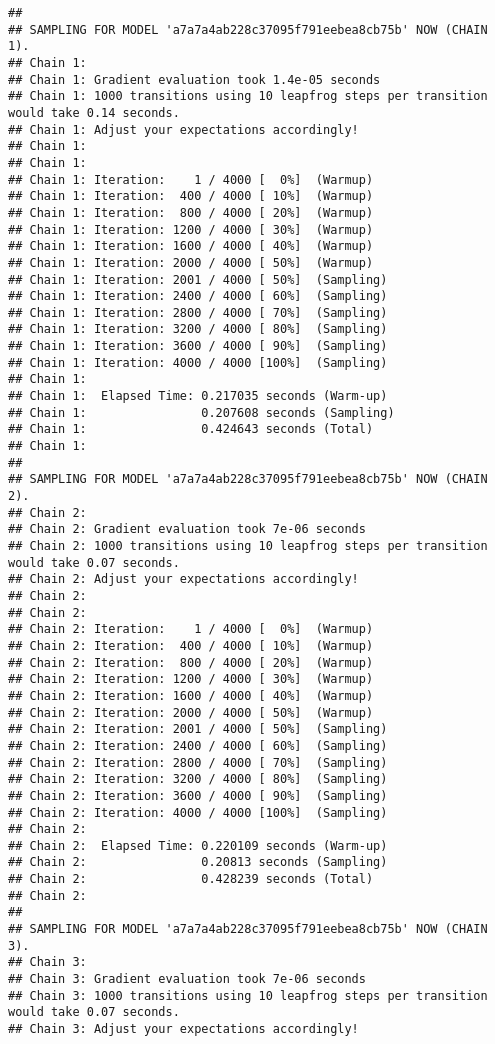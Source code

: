 \documentclass[]{article}
\begin{document}
\begin{verbatim}
## 
## SAMPLING FOR MODEL 'a7a7a4ab228c37095f791eebea8cb75b' NOW (CHAIN 1).
## Chain 1: 
## Chain 1: Gradient evaluation took 1.4e-05 seconds
## Chain 1: 1000 transitions using 10 leapfrog steps per transition would take 0.14 seconds.
## Chain 1: Adjust your expectations accordingly!
## Chain 1: 
## Chain 1: 
## Chain 1: Iteration:    1 / 4000 [  0%]  (Warmup)
## Chain 1: Iteration:  400 / 4000 [ 10%]  (Warmup)
## Chain 1: Iteration:  800 / 4000 [ 20%]  (Warmup)
## Chain 1: Iteration: 1200 / 4000 [ 30%]  (Warmup)
## Chain 1: Iteration: 1600 / 4000 [ 40%]  (Warmup)
## Chain 1: Iteration: 2000 / 4000 [ 50%]  (Warmup)
## Chain 1: Iteration: 2001 / 4000 [ 50%]  (Sampling)
## Chain 1: Iteration: 2400 / 4000 [ 60%]  (Sampling)
## Chain 1: Iteration: 2800 / 4000 [ 70%]  (Sampling)
## Chain 1: Iteration: 3200 / 4000 [ 80%]  (Sampling)
## Chain 1: Iteration: 3600 / 4000 [ 90%]  (Sampling)
## Chain 1: Iteration: 4000 / 4000 [100%]  (Sampling)
## Chain 1: 
## Chain 1:  Elapsed Time: 0.217035 seconds (Warm-up)
## Chain 1:                0.207608 seconds (Sampling)
## Chain 1:                0.424643 seconds (Total)
## Chain 1: 
## 
## SAMPLING FOR MODEL 'a7a7a4ab228c37095f791eebea8cb75b' NOW (CHAIN 2).
## Chain 2: 
## Chain 2: Gradient evaluation took 7e-06 seconds
## Chain 2: 1000 transitions using 10 leapfrog steps per transition would take 0.07 seconds.
## Chain 2: Adjust your expectations accordingly!
## Chain 2: 
## Chain 2: 
## Chain 2: Iteration:    1 / 4000 [  0%]  (Warmup)
## Chain 2: Iteration:  400 / 4000 [ 10%]  (Warmup)
## Chain 2: Iteration:  800 / 4000 [ 20%]  (Warmup)
## Chain 2: Iteration: 1200 / 4000 [ 30%]  (Warmup)
## Chain 2: Iteration: 1600 / 4000 [ 40%]  (Warmup)
## Chain 2: Iteration: 2000 / 4000 [ 50%]  (Warmup)
## Chain 2: Iteration: 2001 / 4000 [ 50%]  (Sampling)
## Chain 2: Iteration: 2400 / 4000 [ 60%]  (Sampling)
## Chain 2: Iteration: 2800 / 4000 [ 70%]  (Sampling)
## Chain 2: Iteration: 3200 / 4000 [ 80%]  (Sampling)
## Chain 2: Iteration: 3600 / 4000 [ 90%]  (Sampling)
## Chain 2: Iteration: 4000 / 4000 [100%]  (Sampling)
## Chain 2: 
## Chain 2:  Elapsed Time: 0.220109 seconds (Warm-up)
## Chain 2:                0.20813 seconds (Sampling)
## Chain 2:                0.428239 seconds (Total)
## Chain 2: 
## 
## SAMPLING FOR MODEL 'a7a7a4ab228c37095f791eebea8cb75b' NOW (CHAIN 3).
## Chain 3: 
## Chain 3: Gradient evaluation took 7e-06 seconds
## Chain 3: 1000 transitions using 10 leapfrog steps per transition would take 0.07 seconds.
## Chain 3: Adjust your expectations accordingly!

\end{verbatim}
\end{document}
